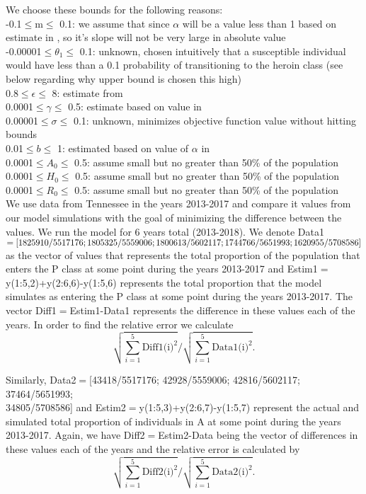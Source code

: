 \documentclass[12pt]{article}
\begin{document}
We choose these bounds for the following reasons: \\
-0.1$\leq$m$\leq$ 0.1: we assume that since $\alpha$ will be a value less than 1 based on estimate in \cite{Battista}, so it's slope will not be very large in absolute value \\
-0.00001$\leq$$\theta_1$$\leq$ 0.1: unknown, chosen intuitively that a susceptible individual would have less than a 0.1 probability of transitioning to the heroin class (see below regarding why upper bound is chosen this high) \\
0.8$\leq$$\epsilon$$\leq$ 8: estimate from \cite{Battista} \\
0.0001$\leq$$\gamma$$\leq$ 0.5: estimate based on value in \cite{Battista} \\
0.00001$\leq$$\sigma$$\leq$ 0.1: unknown, minimizes objective function value without hitting bounds \\
0.01$\leq$$b$$\leq$ 1: estimated based on value of $\alpha$ in \cite{Battista} \\
0.0001$\leq$$A_0$$\leq$ 0.5: assume small but no greater than 50\% of the population \\
0.0001$\leq$$H_0$$\leq$ 0.5: assume small but no greater than 50\% of the population \\
0.0001$\leq$$R_0$$\leq$ 0.5: assume small but no greater than 50\% of the population \\

We use data from Tennessee in the years 2013-2017 and compare it values from our model simulations with the goal of minimizing the difference between the values. We run the model for 6 years total (2013-2018). We denote Data1$=[1825910/5517176; 1805325/5559006; \\
1800613/5602117; 1744766/5651993; 1620955/5708586]$ as the vector of values that represents the total proportion of the population that enters the P class at some point during the years 2013-2017 and Estim1$=$y(1:5,2)+y(2:6,6)-y(1:5,6) represents the total proportion that the model simulates as entering the P class at some point during the years 2013-2017. The vector Diff1$=$Estim1-Data1 represents the difference in these values each of the years. In order to find the relative error we calculate 
$$\displaystyle \sqrt{\sum_{i=1}^{5} \text{Diff1(i)}^2} / \displaystyle \sqrt{\sum_{i=1}^{5} \text{Data1(i)}^2}. $$

Similarly, Data2$=$[43418/5517176; 42928/5559006; 42816/5602117; 37464/5651993; \\ 34805/5708586] and
 Estim2$=$y(1:5,3)+y(2:6,7)-y(1:5,7) represent the actual and simulated total proportion of individuals in A at some point during the years 2013-2017. Again, we have Diff2$=$Estim2-Data being the vector of differences in these values each of the years and the relative error is calculated by 
 $$\displaystyle \sqrt{\sum_{i=1}^{5} \text{Diff2(i)}^2} / \displaystyle \sqrt{\sum_{i=1}^{5} \text{Data2(i)}^2}.$$
 
\end{document}
